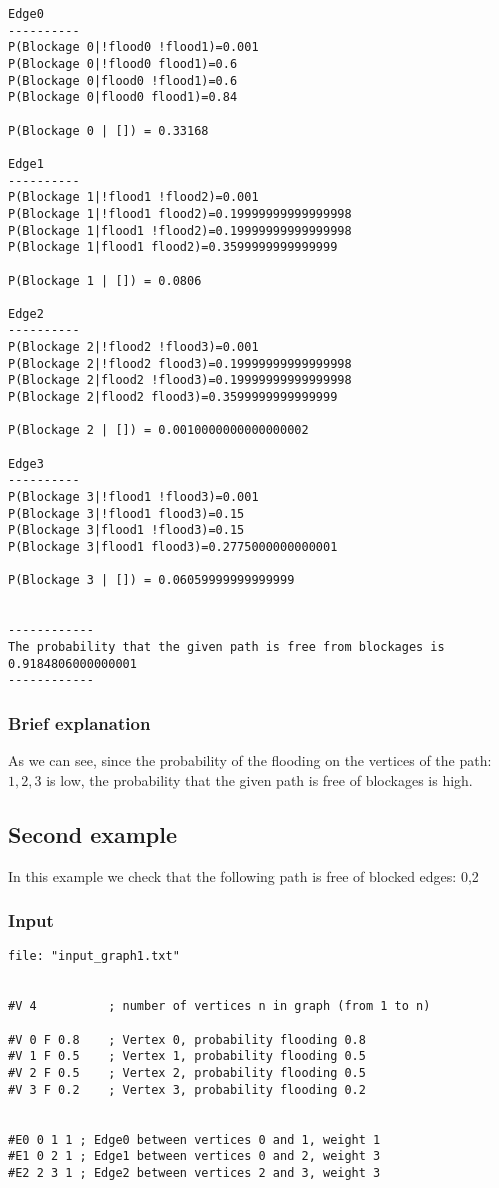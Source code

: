 \documentclass{article}                     %
\begin{document}
\begin{verbatim}
Edge0
----------
P(Blockage 0|!flood0 !flood1)=0.001
P(Blockage 0|!flood0 flood1)=0.6
P(Blockage 0|flood0 !flood1)=0.6
P(Blockage 0|flood0 flood1)=0.84

P(Blockage 0 | []) = 0.33168

Edge1
----------
P(Blockage 1|!flood1 !flood2)=0.001
P(Blockage 1|!flood1 flood2)=0.19999999999999998
P(Blockage 1|flood1 !flood2)=0.19999999999999998
P(Blockage 1|flood1 flood2)=0.3599999999999999

P(Blockage 1 | []) = 0.0806

Edge2
----------
P(Blockage 2|!flood2 !flood3)=0.001
P(Blockage 2|!flood2 flood3)=0.19999999999999998
P(Blockage 2|flood2 !flood3)=0.19999999999999998
P(Blockage 2|flood2 flood3)=0.3599999999999999

P(Blockage 2 | []) = 0.0010000000000000002

Edge3
----------
P(Blockage 3|!flood1 !flood3)=0.001
P(Blockage 3|!flood1 flood3)=0.15
P(Blockage 3|flood1 !flood3)=0.15
P(Blockage 3|flood1 flood3)=0.2775000000000001

P(Blockage 3 | []) = 0.06059999999999999


------------
The probability that the given path is free from blockages is 0.9184806000000001
------------
\end{verbatim}

\subsubsection{Brief explanation}
As we can see, since the probability of the flooding on the vertices of the path: $1,2,3$ is low, the probability that the given path is free of blockages is high.

\subsection{Second example}
In this example we check that the following path is free of blocked edges: 0,2
\subsubsection{Input}
\begin{verbatim}
file: "input_graph1.txt"


#V 4          ; number of vertices n in graph (from 1 to n)

#V 0 F 0.8    ; Vertex 0, probability flooding 0.8
#V 1 F 0.5    ; Vertex 1, probability flooding 0.5
#V 2 F 0.5    ; Vertex 2, probability flooding 0.5
#V 3 F 0.2    ; Vertex 3, probability flooding 0.2


#E0 0 1 1 ; Edge0 between vertices 0 and 1, weight 1
#E1 0 2 1 ; Edge1 between vertices 0 and 2, weight 3
#E2 2 3 1 ; Edge2 between vertices 2 and 3, weight 3
\end{verbatim}
\end{document}
